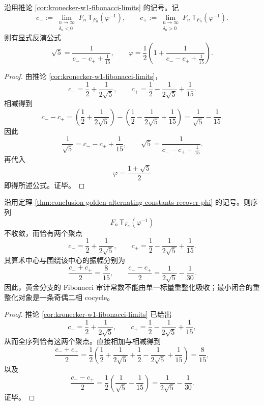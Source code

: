 \begin{theorem}\label{thm:conclusion-golden-alternating-constants-recover-phi}
沿用推论 \ref{cor:kronecker-w1-fibonacci-limits} 的记号。记
\[
c_-:=
\lim_{\substack{n\to\infty\\ \delta_n<0}}
F_n\,\mathsf T_{F_n}(\varphi^{-1}),
\qquad
c_+:=
\lim_{\substack{n\to\infty\\ \delta_n>0}}
F_n\,\mathsf T_{F_n}(\varphi^{-1}).
\]
则有显式反演公式
\[
\boxed{\;
\sqrt5
=
\frac{1}{c_- - c_+ + \frac1{15}},
\qquad
\varphi
=
\frac12\left(1+\frac{1}{c_- - c_+ + \frac1{15}}\right).\;}
\]
\end{theorem}
\begin{proof}
由推论 \ref{cor:kronecker-w1-fibonacci-limits}，
\[
c_-=\frac12+\frac{1}{2\sqrt5},
\qquad
c_+=\frac12-\frac{1}{2\sqrt5}+\frac1{15}.
\]
相减得到
\[
c_- - c_+
=
\left(\frac12+\frac{1}{2\sqrt5}\right)
-
\left(\frac12-\frac{1}{2\sqrt5}+\frac1{15}\right)
=
\frac1{\sqrt5}-\frac1{15}.
\]
因此
\[
\frac1{\sqrt5}=c_- - c_+ + \frac1{15},
\qquad
\sqrt5=\frac{1}{c_- - c_+ + \frac1{15}}.
\]
再代入
\[
\varphi=\frac{1+\sqrt5}{2}
\]
即得所述公式。证毕。
\end{proof}

\begin{corollary}\label{cor:conclusion-golden-fibonacci-two-phase-renormalization}
沿用定理 \ref{thm:conclusion-golden-alternating-constants-recover-phi} 的记号。则序列
\[
F_n\,\mathsf T_{F_n}(\varphi^{-1})
\]
不收敛，而恰有两个聚点
\[
\boxed{\;
c_-=\frac12+\frac{1}{2\sqrt5},
\qquad
c_+=\frac12-\frac{1}{2\sqrt5}+\frac1{15}.\;}
\]
其算术中心与围绕该中心的振幅分别为
\[
\boxed{\;
\frac{c_-+c_+}{2}=\frac{8}{15},
\qquad
\frac{c_--c_+}{2}=\frac{1}{2\sqrt5}-\frac1{30}.\;}
\]
因此，黄金分支的 Fibonacci 审计常数不能由单一标量重整化吸收；最小闭合的重整化对象是一条奇偶二相 cocycle。
\end{corollary}
\begin{proof}
推论 \ref{cor:kronecker-w1-fibonacci-limits} 已给出
\[
c_-=\frac12+\frac{1}{2\sqrt5},
\qquad
c_+=\frac12-\frac{1}{2\sqrt5}+\frac1{15},
\]
从而全序列恰有这两个聚点。直接相加与相减得到
\[
\frac{c_-+c_+}{2}
=
\frac12\left(
\frac12+\frac{1}{2\sqrt5}
+\frac12-\frac{1}{2\sqrt5}+\frac1{15}
\right)
=
\frac{8}{15},
\]
以及
\[
\frac{c_--c_+}{2}
=
\frac12\left(
\frac1{\sqrt5}-\frac1{15}
\right)
=
\frac{1}{2\sqrt5}-\frac1{30}.
\]
证毕。
\end{proof}

